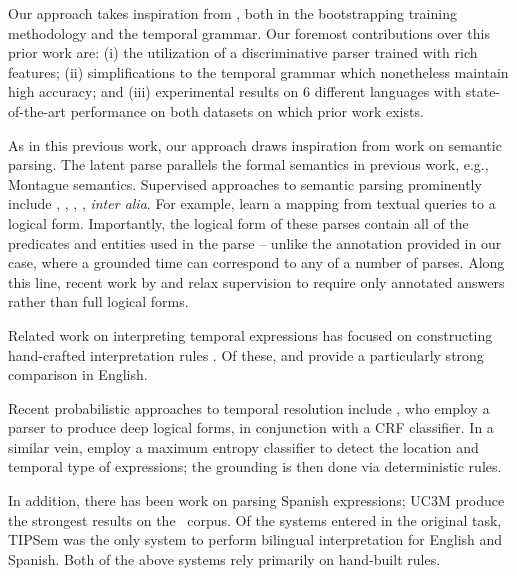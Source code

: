 Our approach takes inspiration from \me, both in the bootstrapping training
  methodology and the temporal grammar.
Our foremost contributions over this prior work are:
  (i) the utilization of a discriminative parser trained with rich features;
  (ii) simplifications to the temporal grammar which nonetheless maintain
       high accuracy;
  and
  (iii) experimental results on 6 different languages with state-of-the-art
        performance on both datasets on which prior work exists.

As in this previous work,
  our approach draws inspiration from work on semantic parsing.
The latent parse parallels the formal semantics in previous work,
	e.g., Montague semantics.
Supervised approaches to semantic parsing prominently include
	,
	,
	, 
	, 
	\textit{inter alia}.
For example,  learn a mapping from
	textual queries to a logical form.
Importantly, the logical form of these parses contain all of the predicates
  and entities used in the parse -- unlike the annotation provided in our case,
  where a grounded time can correspond to any of a number of parses.
Along this line, recent work by  and 
	 relax supervision 
	to require only annotated answers rather than full logical forms.

Related work on interpreting temporal expressions has focused on constructing
	hand-crafted interpretation rules
	\cite{key:2000mani-temporal,key:2003saquete-temporal,key:2004puscasu-temporal,key:2010grover-temporal}.  
Of these,  \cite{key:2010strotgen-temporal} and
	 \cite{key:2012chang-temporal} provide a particularly strong
	comparison in English.

Recent probabilistic approaches to temporal resolution include
	,    %
	who employ a parser to produce deep logical forms, in conjunction with
	a CRF classifier.
In a similar vein,
	employ a maximum entropy classifier to detect the location and temporal
	type of expressions; the grounding is then done via deterministic rules.
	
In addition, there has been work on parsing Spanish expressions;
  UC3M \cite{2010vicente-uc3m} produce the strongest results on the
  \tempeval\ corpus.
Of the systems entered in the original task,
  TIPSem \cite{key:2010llorens-tipsem} was the only system to perform bilingual
  interpretation for English and Spanish.
Both of the above systems rely primarily on hand-built rules.



